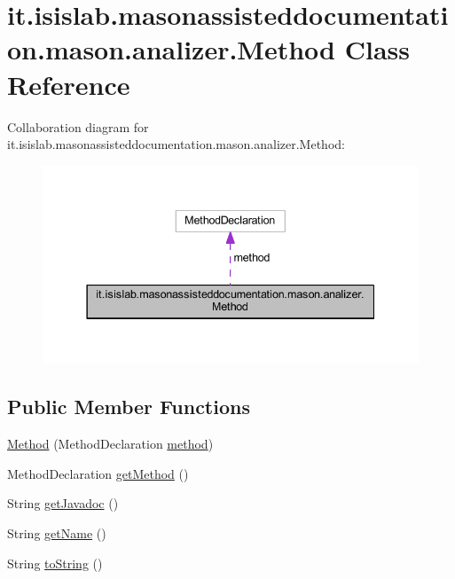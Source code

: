 \hypertarget{classit_1_1isislab_1_1masonassisteddocumentation_1_1mason_1_1analizer_1_1_method}{\section{it.\-isislab.\-masonassisteddocumentation.\-mason.\-analizer.\-Method Class Reference}
\label{classit_1_1isislab_1_1masonassisteddocumentation_1_1mason_1_1analizer_1_1_method}
}


Collaboration diagram for it.\-isislab.\-masonassisteddocumentation.\-mason.\-analizer.\-Method\-:\nopagebreak
\begin{figure}[H]
\begin{center}
\leavevmode
\includegraphics[width=337pt]{classit_1_1isislab_1_1masonassisteddocumentation_1_1mason_1_1analizer_1_1_method__coll__graph}
\end{center}
\end{figure}
\subsection*{Public Member Functions}
\begin{DoxyCompactItemize}
\item 
\hyperlink{classit_1_1isislab_1_1masonassisteddocumentation_1_1mason_1_1analizer_1_1_method_a757ff14fb55a88bf5e27c4af55e4d1b4}{Method} (Method\-Declaration \hyperlink{classit_1_1isislab_1_1masonassisteddocumentation_1_1mason_1_1analizer_1_1_method_a90dcaceeda469988d15bfb9c5bbb8487}{method})
\item 
Method\-Declaration \hyperlink{classit_1_1isislab_1_1masonassisteddocumentation_1_1mason_1_1analizer_1_1_method_a8d2f7bfdb9e487a2564d8ebe46bc946e}{get\-Method} ()
\item 
String \hyperlink{classit_1_1isislab_1_1masonassisteddocumentation_1_1mason_1_1analizer_1_1_method_a04c17c96931db2403fb5a5eca7d3837b}{get\-Javadoc} ()
\item 
String \hyperlink{classit_1_1isislab_1_1masonassisteddocumentation_1_1mason_1_1analizer_1_1_method_a87c28d457164a753322c0849ba2bc981}{get\-Name} ()
\item 
String \hyperlink{classit_1_1isislab_1_1masonassisteddocumentation_1_1mason_1_1analizer_1_1_method_ae68759230dfc5543fd98bfaba0c4d4a9}{to\-String} ()
\end{DoxyCompactItemize}
